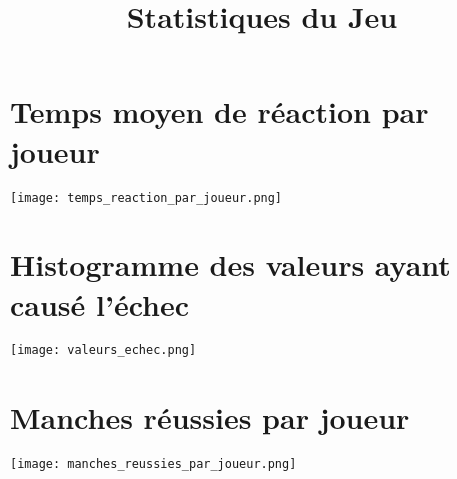 \documentclass{article}
\title{Statistiques du Jeu}
\author{}
\date{}
\begin{document}
\maketitle

\section*{Temps moyen de réaction par joueur}
\texttt{[image: temps\_reaction\_par\_joueur.png]}

\section*{Histogramme des valeurs ayant causé l'échec}
\texttt{[image: valeurs\_echec.png]}

\section*{Manches réussies par joueur}
\texttt{[image: manches\_reussies\_par\_joueur.png]}
\end{document}
